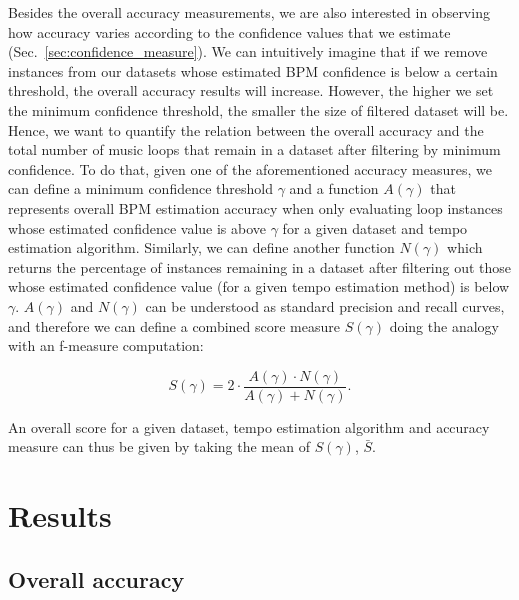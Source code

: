 \documentclass{article}
\begin{document}
Besides the overall accuracy measurements, we are also interested in observing how accuracy varies according to the confidence values that we estimate (Sec.~\ref{sec:confidence_measure}).
We can intuitively imagine that if we remove instances from our datasets whose estimated BPM confidence is below a certain threshold, the overall accuracy results will increase. 
However, the higher we set the minimum confidence threshold, the smaller the size of filtered dataset will be.
Hence, we want to quantify the relation between the overall accuracy and the total number of music loops that remain in a dataset after filtering by minimum confidence.
To do that, given one of the aforementioned accuracy measures, we can define a minimum confidence threshold $\gamma$ and a function $A(\gamma)$ that represents overall BPM estimation accuracy when only evaluating loop instances whose estimated confidence value is above $\gamma$ for a given dataset and tempo estimation algorithm.
Similarly, we can define another function $N(\gamma)$ which returns the percentage of instances remaining in a dataset after filtering out those whose estimated confidence value (for a given tempo estimation method) is below $\gamma$. $A(\gamma)$ and $N(\gamma)$ can be understood as standard precision and recall curves, and therefore we can define a combined score measure $S(\gamma)$ doing the analogy with an f-measure computation:

$$ S(\gamma) = 2 \cdot \frac{A(\gamma) \cdot N(\gamma)}{A(\gamma) + N(\gamma)}.$$

An overall score for a given dataset, tempo estimation algorithm and accuracy measure can thus be given by taking the mean of $S(\gamma)$, $\bar S$.

\section{Results}\label{sec:results}

\subsection{Overall accuracy}\label{sec:results_overall}
\end{document}

